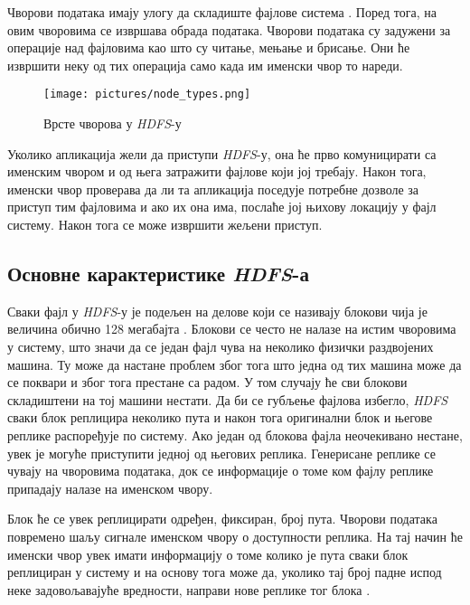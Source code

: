\documentclass[12pt,oneside]{memoir}
\begin{document}
Чворови података имају улогу да складиште фајлове система \cite{hadoop_arch_guide}. Поред тога, на овим чворовима се извршава обрада података. Чворови података су задужени за операције над фајловима као што су читање, мењање и брисање. Они ће извршити неку од тих операција само када им именски чвор то нареди.

\begin{figure}[!ht]
  \centering
  \texttt{[image: pictures/node\_types.png]}
  \caption{Врсте чворова у \textit{HDFS}-у}
  \label{fig:hadoop_nodovi}
\end{figure}

Уколико апликација жели да приступи \textit{HDFS}-у, она ће прво комуницирати са именским чвором и од њега затражити фајлове који јој требају. Након тога, именски чвор проверава да ли та апликација поседује потребне дозволе за приступ тим фајловима и ако их она има, послаће јој њихову локацију у фајл систему. Након тога се може извршити жељени приступ. 

\subsection{Основне карактеристике \textit{HDFS}-а}
\label{subsec:hdfs_osobine}

Сваки фајл у \textit{HDFS}-у је подељен на делове који се називају блокови чија је величина обично 128 мегабајта \cite{hadoop_arch_guide}. Блокови се често не налазе на истим чворовима у систему, што значи да се један фајл чува на неколико физички раздвојених машина. Ту може да настане проблем због тога што једна од тих машина може да се поквари и због тога престане са радом. У том случају ће сви блокови складиштени на тој машини нестати. Да би се губљење фајлова избегло, \textit{HDFS} сваки блок реплицира неколико пута и након тога оригинални блок и његове реплике распоређује по систему. Ако један од блокова фајла неочекивано нестане, увек је могуће приступити једној од његових реплика. Генерисане реплике се чувају на чворовима података, док се информације о томе ком фајлу реплике припадају налазе на именском чвору.

Блок ће се увек реплицирати одређен, фиксиран, број пута. Чворови података повремено шаљу сигнале именском чвору о доступности реплика. На тај начин ће именски чвор увек имати информацију о томе колико је пута сваки блок реплициран у систему и на основу тога може да, уколико тај број падне испод неке задовољавајуће вредности, направи нове реплике тог блока \cite{hadoop_arch_guide}.
\end{document}
